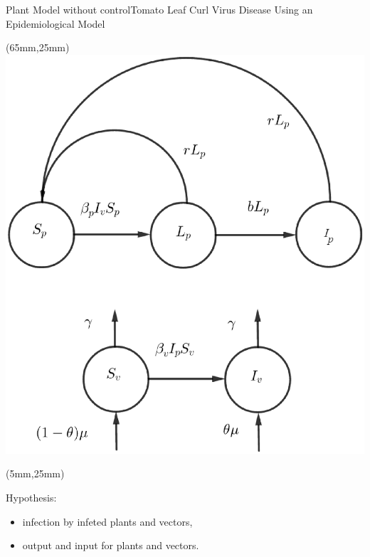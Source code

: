 \documentclass[10pt]{beamer}
\begin{document}
\begin{frame}{Plant Model without control}{Tomato Leaf Curl Virus Disease Using an Epidemiological Model}
\begin{textblock*}{60mm}(65mm,25mm)
    \includegraphics[width=\linewidth]{Feathergraphics/plant_diagram.eps}
\end{textblock*}
\begin{textblock*}{55mm}(5mm,25mm)
	\begin{graybox}{Hypothesis:}
		
		\begin{itemize}
			\item infection by infeted plants and vectors,
			\item output and input for plants and vectors. 
		\end{itemize}
		\end{graybox}	
\end{textblock*}
\end{frame}
\end{document}
